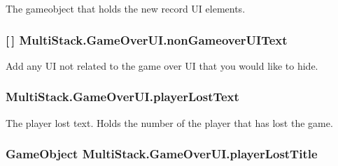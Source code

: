 The gameobject that holds the new record U\+I elements. 

\hypertarget{class_multi_stack_1_1_game_over_u_i_ac8abcfde257e94e4d943e193adff17b9}{}
\subsubsection[{non\+Gameover\+U\+I\+Text}]{ \mbox{[}$\,$\mbox{]} Multi\+Stack.\+Game\+Over\+U\+I.\+non\+Gameover\+U\+I\+Text}\label{class_multi_stack_1_1_game_over_u_i_ac8abcfde257e94e4d943e193adff17b9}


Add any U\+I not related to the game over U\+I that you would like to hide. 

\hypertarget{class_multi_stack_1_1_game_over_u_i_a8b3c9a1f48b013cbfb3cc2581e98ba0f}{}
\subsubsection[{player\+Lost\+Text}]{ Multi\+Stack.\+Game\+Over\+U\+I.\+player\+Lost\+Text}\label{class_multi_stack_1_1_game_over_u_i_a8b3c9a1f48b013cbfb3cc2581e98ba0f}


The player lost text. Holds the number of the player that has lost the game. 

\hypertarget{class_multi_stack_1_1_game_over_u_i_adb0fbbb861cbd3ffe4afee821e549892}{}
\subsubsection[{player\+Lost\+Title}]{\setlength{\rightskip}{0pt plus 5cm}Game\+Object Multi\+Stack.\+Game\+Over\+U\+I.\+player\+Lost\+Title}\label{class_multi_stack_1_1_game_over_u_i_adb0fbbb861cbd3ffe4afee821e549892}


